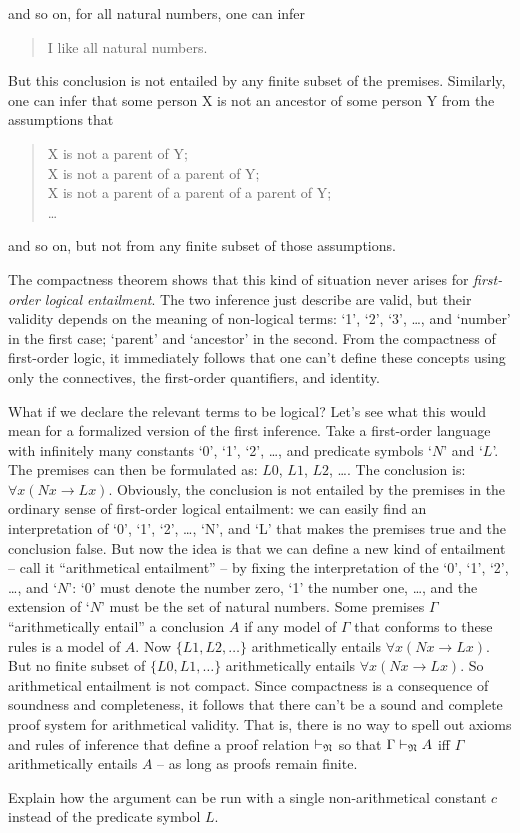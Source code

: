 and so on, for all natural numbers,
one can infer

\begin{quote}
  I like all natural numbers.
\end{quote}

But this conclusion is not entailed by any finite subset of the premises.
Similarly,
one can infer that
some person X is not an ancestor of some person Y
from the assumptions that

\begin{quote}
  X is not a parent of Y;\\
  X is not a parent of a parent of Y;\\
  X is not a parent of a parent of a parent of Y;\\
  \ldots
\end{quote}

and so on, but not from any finite subset of those assumptions.

The compactness theorem shows that
this kind of situation never arises for \emph{first-order logical entailment}.
The two inference just describe are valid,
but their validity depends on the meaning of non-logical terms:
`1', `2', `3', \ldots, and `number' in the first case;
`parent' and `ancestor' in the second.
From the compactness of first-order logic,
it immediately follows that
one can't define these concepts
using only the connectives, the first-order quantifiers, and identity.

What if we declare the relevant terms to be logical?
Let's see what this would mean for a formalized version of the first inference.
Take a first-order language
with infinitely many constants `0', `1', `2', \ldots, and predicate symbols `$N$' and `$L$'.
The premises can then be formulated as: $L0$, $L1$, $L2$, \ldots.
The conclusion is: $\forall x (Nx \to Lx)$.
Obviously,
the conclusion is not entailed by the premises in the ordinary sense of first-order logical entailment:
we can easily find an interpretation of `0', `1', `2', \ldots, `N', and `L'
that makes the premises true and the conclusion false.
But now the idea is that we can define a new kind of entailment
-- call it ``arithmetical entailment'' --
by fixing the interpretation of the `0', `1', `2', \ldots, and `$N$':
`0' must denote the number zero,
`1' the number one, \ldots,
and the extension of `$N$' must be the set of natural numbers.
Some premises $\Gamma$ ``arithmetically entail'' a conclusion $A$ if
any model of $\Gamma$ that conforms to these rules is a model of $A$.
Now $\{ L1, L2, \ldots \}$ arithmetically entails $\forall x (Nx \to Lx)$.
But no finite subset of $\{ L0, L1, \ldots \}$ arithmetically entails $\forall x (Nx \to Lx)$.
So arithmetical entailment is not compact.
Since compactness is a consequence of soundness and completeness,
it follows that
there can't be a sound and complete proof system for arithmetical validity.
That is,
there is no way to spell out axioms and rules of inference that define a proof relation $\vdash_{\mathfrak{N}}$ so that
$\Gamma \vdash_{\mathfrak{N}} A$ iff $\Gamma$ arithmetically entails $A$
-- as long as proofs remain finite.

\begin{exercise}
  Explain how the argument can be run with a single non-arithmetical constant $c$ instead of the predicate symbol $L$.
\end{exercise}

\fi


